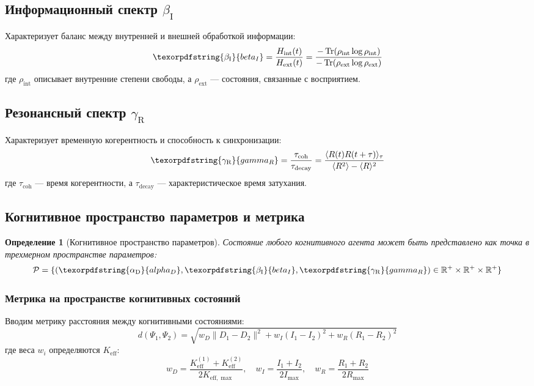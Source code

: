 \documentclass[12pt,a4paper]{article}
\newtheorem{definition}{Определение}
\DeclareMathOperator{\Tr}{Tr}
\DeclareRobustCommand{\alD}{\texorpdfstring{\ensuremath{\alpha_{\mathrm{D}}}}{alpha_D}}
\DeclareRobustCommand{\beI}{\texorpdfstring{\ensuremath{\beta_{\mathrm{I}}}}{beta_I}}
\DeclareRobustCommand{\gaR}{\texorpdfstring{\ensuremath{\gamma_{\mathrm{R}}}}{gamma_R}}
\newcommand{\eff}{\mathrm{eff}}
\newcommand{\Ke}{K_{\eff}}
\newcommand{\Kemax}{K_{\eff,\max}}
\begin{document}
	\subsection{Информационный спектр \beI}
	
	Характеризует баланс между внутренней и внешней обработкой информации:
	\begin{equation}
		\label{eq:betaI}
		\beI = \frac{H_{\mathrm{int}}(t)}{H_{\mathrm{ext}}(t)} = \frac{-\Tr(\rho_{\mathrm{int}}\log\rho_{\mathrm{int}})}{-\Tr(\rho_{\mathrm{ext}}\log\rho_{\mathrm{ext}})}
	\end{equation}
	где \(\rho_{\mathrm{int}}\) описывает внутренние степени свободы, а \(\rho_{\mathrm{ext}}\) — состояния, связанные с восприятием.
	
	\subsection{Резонансный спектр \gaR}
	
	Характеризует временную когерентность и способность к синхронизации:
	\begin{equation}
		\label{eq:gammaR}
		\gaR = \frac{\tau_{\mathrm{coh}}}{\tau_{\mathrm{decay}}} = \frac{\langle R(t)R(t+\tau)\rangle_\tau}{\langle R^2\rangle - \langle R\rangle^2}
	\end{equation}
	где \(\tau_{\mathrm{coh}}\) — время когерентности, а \(\tau_{\mathrm{decay}}\) — характеристическое время затухания.
	
	\subsection{Когнитивное пространство параметров и метрика}
	
	\begin{definition}[Когнитивное пространство параметров]
		Состояние любого когнитивного агента может быть представлено как точка в трехмерном пространстве параметров:
		\[
		\mathcal{P} = \{(\alD, \beI, \gaR) \in \mathbb{R}^+ \times \mathbb{R}^+ \times \mathbb{R}^+\}
		\]
	\end{definition}
	
	\subsubsection{Метрика на пространстве когнитивных состояний}
	Вводим метрику расстояния между когнитивными состояниями:
	\[
	d(\Psi_1, \Psi_2) = \sqrt{w_D \|D_1 - D_2\|^2 + w_I (I_1 - I_2)^2 + w_R (R_1 - R_2)^2}
	\]
	где веса \(w_i\) определяются \(\Ke\):
	\[
	w_D = \frac{\Ke^{(1)} + \Ke^{(2)}}{2\Kemax}, \quad w_I = \frac{I_1 + I_2}{2I_{\max}}, \quad w_R = \frac{R_1 + R_2}{2R_{\max}}
	\]
	
\end{document}

